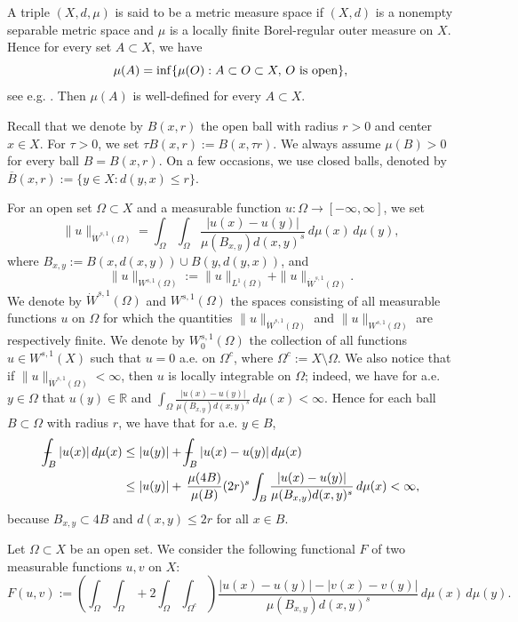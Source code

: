 \documentclass[11pt,leqno]{amsart}
\def\Xint#1{\mathchoice
	{\XXint\displaystyle\textstyle{#1}}
	{\XXint\textstyle\scriptstyle{#1}}
	{\XXint\scriptstyle\scriptscriptstyle{#1}}
	{\XXint\scriptscriptstyle\scriptscriptstyle{#1}}
	\!\int}
\def\XXint#1#2#3{{\setbox0=\hbox{$#1{#2#3}{\int}$ }
		\vcenter{\hbox{$#2#3$ }}\kern-.6\wd0}}
\def\dashint{\Xint-}
\numberwithin{equation}{section}
\theoremstyle{definition}
\begin{document}
	A triple $(X,d,\mu)$ is said to be a metric measure space if $(X,d)$
	is a nonempty separable metric space and $\mu$ is a locally finite Borel-regular
	outer measure on $X$.
	Hence for every
	set $A\subset X$, we have
	\[
	\mu(A)= \inf \{ \mu(O): A\subset O\subset X,\, O\  {\rm is\ open} \},
	\]
	see e.g. \cite[Proposition 3.3.37]{HKST15}.
	Then $\mu(A)$ is well-defined for every $A\subset X$.
	
	Recall that we denote by $B(x,r)$ the open ball with radius $r>0$ and center $x\in X$.
	For $\tau>0$, we set $\tau B(x,r):=B(x,\tau r)$.
	We always assume $\mu(B)>0$ for every ball $B=B(x,r)$.
	On a few occasions, we use closed balls, denoted by 
	$\overline{B}{(x,r)}:=\{y\in X:d(y,x)\le r\}$.
	
	
	For an open set $\Omega\subset X$ and
	a measurable function $u:\Omega\to [-\infty, \infty]$, we set
	\[
	\|u\|_{\dot W^{s,1}(\Omega)}=\int_{\Omega}\int_{\Omega}\frac{|u(x)-u(y)|}{\mu(B_{x,y})d(x,y)^s}\,d\mu(x)\,d\mu(y),
	\]
	where $B_{x,y}:=B(x,d(x,y))\cup B(y,d(y,x))$, and
	\[
	\|u\|_{W^{s,1}(\Omega)}:=\|u\|_{L^1(\Omega)}+\|u\|_{\dot W^{s,1}(\Omega)}.
	\]
	We denote by $ \dot W^{s,1}(\Omega)$ and $W^{s,1}(\Omega)$ the spaces consisting of all measurable functions $u$ on $\Omega$ for which  the quantities $\|u\|_{\dot W^{s,1}(\Omega)}$ and $\|u\|_{W^{s,1}(\Omega)}$ are respectively finite. We denote by $W^{s,1}_0(\Omega)$ the collection of all functions $u\in W^{s,1}(X)$ such that $u= 0$ a.e. on $\Omega^c$, where $\Omega^c:=X\setminus\Omega$.
	We also notice
	that if $\|u\|_{\dot W^{s,1}(\Omega)}<\infty$, then $u$ is locally integrable on $\Omega$;
	indeed,
	we have for a.e. $y\in \Omega$ that $u(y)\in\mathbb R$ and $\int_{\Omega}\frac{|u(x)-u(y)|}{\mu(B_{x,y})d(x,y)^s}\,d\mu(x)<\infty$. Hence for each ball $B\subset\Omega$ with radius $r$, we have that for a.e. $y\in B$,  
	\begin{align}\label{eq2.1-11dec}
		\dashint_B |u(x)|\,d\mu(x)
		&\leq  |u(y)|+\dashint_{B} {|u(x)-u(y)|}\,d\mu(x)\\
		&\leq |u(y)|+\, \frac{\mu(4B) }{\mu(B)}(2r)^s\int_{B} \frac{|u(x)-u(y)|}{\mu(B_{x,y})d(x,y)^s}\,d\mu(x)<\infty,  \notag
	\end{align}
	because
	$B_{x,y}\subset 4B$
	and $d(x,y)\leq 2r$ for all $x\in B$.
	
	Let $\Omega\subset X$ be an open set.
	We consider the following functional $F$ of
	two measurable functions $u,v$ on $X$:
	\[
	F(u,v):=\left(\int_{\Omega}\int_{\Omega}+2\int_{\Omega}\int_{\Omega^c}\right) \frac{|u(x)-u(y)|-|v(x)-v(y)|}{\mu(B_{x,y})d(x,y)^s}\,d\mu(x)\,d\mu(y).
	\]
	
\end{document}
